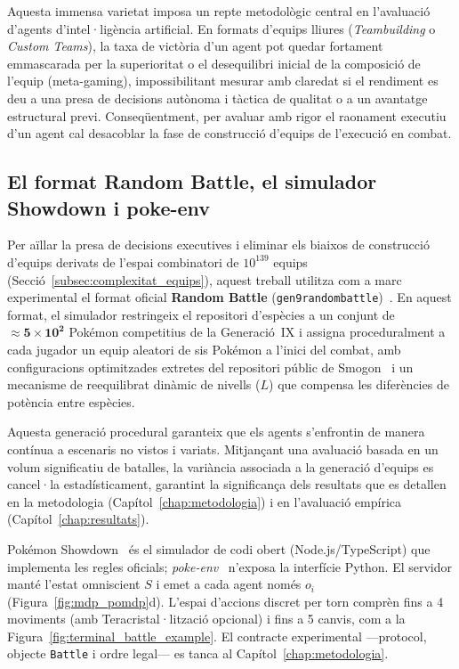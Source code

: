 Aquesta immensa varietat imposa un repte metodològic central en l'avaluació d'agents d'intel·ligència artificial. En formats d'equips lliures (\emph{Teambuilding} o \emph{Custom Teams}), la taxa de victòria d'un agent pot quedar fortament emmascarada per la superioritat o el desequilibri inicial de la composició de l'equip (meta-gaming), impossibilitant mesurar amb claredat si el rendiment es deu a una presa de decisions autònoma i tàctica de qualitat o a un avantatge estructural previ. Conseqüentment, per avaluar amb rigor el raonament executiu d'un agent cal desacoblar la fase de construcció d'equips de l'execució en combat.

\subsection{El format Random Battle, el simulador Showdown i poke-env}
\label{sec:format}

Per aïllar la presa de decisions executives i eliminar els biaixos de construcció d'equips derivats de l'espai combinatori de \textbf{$10^{139}$} equips (Secció~\ref{subsec:complexitat_equips}), aquest treball utilitza com a marc experimental el format oficial \textbf{Random Battle} (\texttt{gen9randombattle})~\cite{smogon_random_battle}. En aquest format, el simulador restringeix el repositori d'espècies a un conjunt de $\approx \mathbf{5 \times 10^2}$ Pokémon competitius de la Generació~IX i assigna proceduralment a cada jugador un equip aleatori de sis Pokémon a l'inici del combat, amb configuracions optimitzades extretes del repositori públic de Smogon~\cite{smogon_rb_sets} i un mecanisme de reequilibrat dinàmic de nivells ($L$) que compensa les diferències de potència entre espècies.

Aquesta generació procedural garanteix que els agents s'enfrontin de manera contínua a escenaris no vistos i variats. Mitjançant una avaluació basada en un volum significatiu de batalles, la variància associada a la generació d'equips es cancel·la estadísticament, garantint la significança dels resultats que es detallen en la metodologia (Capítol~\ref{chap:metodologia}) i en l'avaluació empírica (Capítol~\ref{chap:resultats}).

Pokémon Showdown~\cite{pokemon_showdown} és el simulador de codi obert (Node.js/TypeScript) que implementa les regles oficials; \textit{poke-env}~\cite{poke_env} n'exposa la interfície Python. El servidor manté l'estat omniscient $S$ i emet a cada agent només $o_i$ (Figura~\ref{fig:mdp_pomdp}d). L'espai d'accions discret per torn comprèn fins a 4 moviments (amb Teracristal·lització opcional) i fins a 5 canvis, com a la Figura~\ref{fig:terminal_battle_example}. El contracte experimental ---protocol, objecte \texttt{Battle} i ordre legal--- es tanca al Capítol~\ref{chap:metodologia}.

